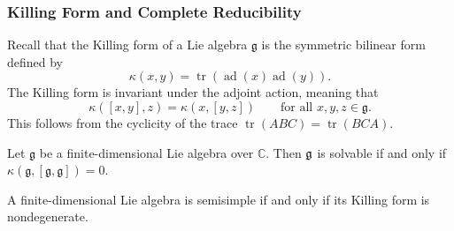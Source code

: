 \documentclass[12pt]{article}
\begin{document}
\subsubsection{Killing Form and Complete Reducibility}
Recall that the Killing form of a Lie algebra $\mathfrak g$ is the symmetric bilinear form defined by
\[\kappa(x,y) = \operatorname{tr}(\operatorname{ad}(x)\operatorname{ad}(y)).\]
The Killing form is invariant under the adjoint action, meaning that
\[\kappa([x,y],z) = \kappa(x,[y,z]) \qquad\text{for all }x,y,z \in \mathfrak g.\]
This follows from the cyclicity of the trace $\operatorname{tr}(ABC) = \operatorname{tr}(BCA)$.
\begin{theorem}
    Let $\mathfrak g$ be a finite-dimensional Lie algebra over $\mathbb{C}$. Then $\mathfrak{g}$ is solvable if and only if $\kappa(\mathfrak g, [\mathfrak g, \mathfrak g]) = 0$.
\end{theorem}

\begin{theorem}
    A finite-dimensional Lie algebra is semisimple if and only if its Killing form is nondegenerate.\end{theorem}
\end{document}
